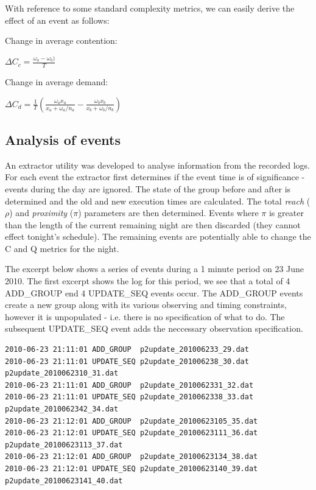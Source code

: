 
With reference to some standard complexity metrics, we can easily derive the effect of an event as follows:

Change in average contention:

$\Delta C_c = \frac{\omega_a - \omega_b)}{T}$

Change in average demand:

$\Delta C_d  = \frac{1}{T} \left (\frac{\omega_a x_a}{x_a+\omega_a / n_a} -  \frac{\omega_b x_b}{x_b+\omega_b / n_b} \right) $

\subsection{Analysis of events}
\label{sect:volanal}
An extractor utility was developed to analyse information from the recorded logs. For each event the extractor first determines if the event time is of significance - events during the day are ignored. The state of the group before and after is determined and the old and new execution times are calculated. The total \emph{reach} ($\rho$) and \emph{proximity} ($\pi$) parameters are then determined. Events where $\pi$ is greater than the length of the current remaining night are then discarded (they cannot effect tonight's schedule). The remaining events are potentially able to change the C and Q metrics for the night. 


The excerpt below shows a series of events during a 1 minute period on 23 June 2010. The first excerpt shows the log for this period, we see that a total of 4  \textsc{ADD\_GROUP} end 4 \textsc{UPDATE\_SEQ} events occur. The \textsc{ADD\_GROUP} events create a new group along with its various observing and timing constraints, however it is unpopulated - i.e. there is no specification of what to do. The subsequent \textsc{UPDATE\_SEQ} event adds the neccessary observation specification.

\scriptsize
\begin{verbatim}
2010-06-23 21:11:01 ADD_GROUP  p2update_201006233_29.dat
2010-06-23 21:11:01 UPDATE_SEQ p2update_201006238_30.dat   p2update_2010062310_31.dat
2010-06-23 21:11:01 ADD_GROUP  p2update_2010062331_32.dat
2010-06-23 21:11:01 UPDATE_SEQ p2update_2010062338_33.dat  p2update_2010062342_34.dat
2010-06-23 21:12:01 ADD_GROUP  p2update_20100623105_35.dat
2010-06-23 21:12:01 UPDATE_SEQ p2update_20100623111_36.dat p2update_20100623113_37.dat
2010-06-23 21:12:01 ADD_GROUP  p2update_20100623134_38.dat
2010-06-23 21:12:01 UPDATE_SEQ p2update_20100623140_39.dat p2update_20100623141_40.dat
\end{verbatim}
\normalsize

